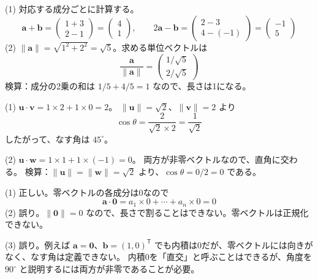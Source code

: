 \documentclass[11pt]{article}
\begin{document}

\problem
\begin{ans}
(1) 対応する成分ごとに計算する。
\[
\boldsymbol a+\boldsymbol b=\begin{pmatrix}1+3\\2-1\end{pmatrix}=\begin{pmatrix}4\\1\end{pmatrix},\qquad
2\boldsymbol a-\boldsymbol b=\begin{pmatrix}2-3\\4-(-1)\end{pmatrix}=\begin{pmatrix}-1\\5\end{pmatrix}
\]
(2) $\|\boldsymbol a\|=\sqrt{1^2+2^2}=\sqrt5$。求める単位ベクトルは
\[
\frac{\boldsymbol a}{\|\boldsymbol a\|}=\begin{pmatrix}1/\sqrt5\\2/\sqrt5\end{pmatrix}
\]
検算：成分の2乗の和は $1/5+4/5=1$ なので、長さは1になる。
\end{ans}

\problem
\begin{ans}
(1) $\boldsymbol u\cdot\boldsymbol v=1\times2+1\times0=2$。
$\|\boldsymbol u\|=\sqrt2$、$\|\boldsymbol v\|=2$ より
\[
\cos\theta=\frac{2}{\sqrt2\times2}=\frac1{\sqrt2}
\]
したがって、なす角は $45^\circ$。

(2) $\boldsymbol u\cdot\boldsymbol w=1\times1+1\times(-1)=0$。
両方が非零ベクトルなので、直角に交わる。
検算：$\|\boldsymbol u\|=\|\boldsymbol w\|=\sqrt2$ より、$\cos\theta=0/2=0$ である。
\end{ans}

\newpage
\problem
\begin{ans}
(1) 正しい。零ベクトルの各成分は0なので
\[ \boldsymbol a\cdot\boldsymbol 0=a_1\times0+\cdots+a_n\times0=0 \]
(2) 誤り。$\|\boldsymbol 0\|=0$ なので、長さで割ることはできない。零ベクトルは正規化できない。

(3) 誤り。例えば $\boldsymbol a=\boldsymbol 0$、$\boldsymbol b=(1,0)^{\mathsf T}$ でも内積は0だが、零ベクトルには向きがなく、なす角は定義できない。
内積0を「直交」と呼ぶことはできるが、角度を $90^\circ$ と説明するには両方が非零であることが必要。
\end{ans}
\end{document}
